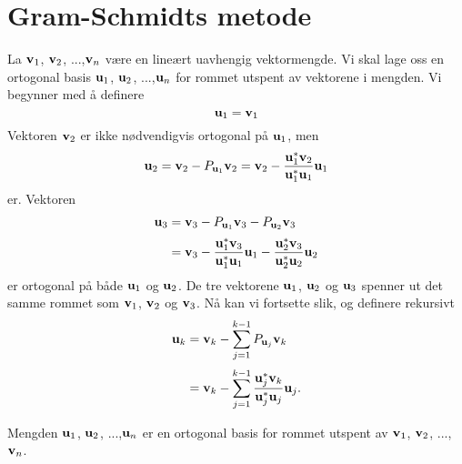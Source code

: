 \section*{Gram-Schmidts metode}
La $\mathbf{v}_1$, $\mathbf{v}_2$, ...,$\mathbf{v}_n$ være en lineært uavhengig vektormengde. 
Vi skal lage oss en ortogonal basis $\mathbf{u}_1$, $\mathbf{u}_2$, ...,$\mathbf{u}_n$ for rommet utspent av vektorene i mengden. 
Vi begynner med å definere
\[
\mathbf{u}_1=\mathbf{v}_1
\]
Vektoren $\mathbf{v}_2$ er ikke nødvendigvis ortogonal på $\mathbf{u}_1$, men 
\[
\mathbf{u}_2=\mathbf{v}_2-P_{\mathbf{u}_1} \mathbf{v}_2=\mathbf{v}_2-\frac{ \mathbf{u}_1^*\mathbf{v}_2}{\mathbf{u}_1^* \mathbf{u}_1}\mathbf{u}_1
\]
er. 
Vektoren 
\begin{align*}
\mathbf{u}_3&=\mathbf{v}_3-P_{\mathbf{u}_1} \mathbf{v}_3-P_{\mathbf{u}_2} \mathbf{v}_3\\[2pt]&=\mathbf{v}_3-\frac{ \mathbf{u}_1^*\mathbf{v}_3}{\mathbf{u}_1^* \mathbf{u}_1}\mathbf{u}_1-\frac{ \mathbf{u}_2^*\mathbf{v}_3}{\mathbf{u}_2^* \mathbf{u}_2}\mathbf{u}_2
\end{align*}
er ortogonal på både $\mathbf{u}_1$ og $\mathbf{u}_2$. 
De tre vektorene $\mathbf{u}_1$, $\mathbf{u}_2$ og $\mathbf{u}_3$  
spenner ut det samme rommet som $\mathbf{v}_1$, $\mathbf{v}_2$ og $\mathbf{v}_3$. 
Nå kan vi fortsette slik, og definere rekursivt
\begin{align*}
\mathbf{u}_k&=\mathbf{v}_k-\sum_{j=1}^{k-1}P_{\mathbf{u}_j} \mathbf{v}_k\\[2pt]&=\mathbf{v}_k-\sum_{j=1}^{k-1}\frac{ \mathbf{u}_j^*\mathbf{v}_k}{\mathbf{u}_j^* \mathbf{u}_j}\mathbf{u}_j.
\end{align*}
\begin{thm}
Mengden $\mathbf{u}_1$, $\mathbf{u}_2$, ...,$\mathbf{u}_n$ er en ortogonal basis for rommet utspent av $\mathbf{v}_1$, $\mathbf{v}_2$, ...,$\mathbf{v}_n$.
\end{thm}
